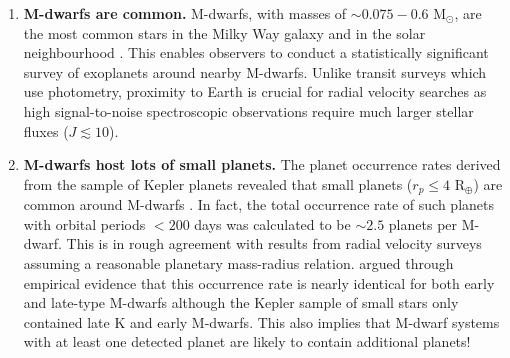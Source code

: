 \begin{enumerate}
\item \textbf{M-dwarfs are common.} M-dwarfs, with masses of $\sim 0.075-0.6$ 
M$_{\odot}$, are the most common stars in the Milky Way galaxy 
\parencite{chabrier03} and in the solar neighbourhood \parencite{henry09}. This 
enables observers to conduct a statistically significant survey of exoplanets 
around nearby M-dwarfs. Unlike transit surveys which use photometry, 
proximity to Earth is crucial for radial velocity searches as high signal-to-noise 
spectroscopic observations require much larger stellar fluxes ($J \lesssim 10$).
\item \textbf{M-dwarfs host lots of small planets.} The 
planet occurrence rates derived from the sample of Kepler planets 
revealed that small planets ($r_p \leq 4$ R$_{\oplus}$) are common around 
M-dwarfs \parencite{dressing15a, gaidos16}. In fact, the total occurrence rate 
of such planets with orbital periods $< 200$ days was calculated to be 
$\sim 2.5$ planets per M-dwarf. This is in rough agreement with results from 
radial velocity surveys \parencite[e.g.][]{bonfils13} assuming a reasonable 
planetary mass-radius relation. \cite{berta13} argued 
through empirical evidence that this occurrence rate is nearly 
identical for both early and late-type M-dwarfs although the Kepler sample of 
small stars only 
contained late K and early M-dwarfs. This also implies that M-dwarf systems with at least 
one detected planet \parencite[e.g. GJ 1132b;][]{berta15} are likely to contain additional 
planets!


\end{enumerate}
